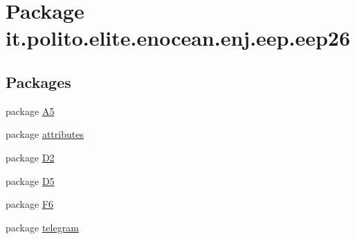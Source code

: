 \hypertarget{namespaceit_1_1polito_1_1elite_1_1enocean_1_1enj_1_1eep_1_1eep26}{}\section{Package it.\+polito.\+elite.\+enocean.\+enj.\+eep.\+eep26}
\label{namespaceit_1_1polito_1_1elite_1_1enocean_1_1enj_1_1eep_1_1eep26}
\subsection*{Packages}
\begin{DoxyCompactItemize}
\item 
package \hyperlink{namespaceit_1_1polito_1_1elite_1_1enocean_1_1enj_1_1eep_1_1eep26_1_1_a5}{A5}
\item 
package \hyperlink{namespaceit_1_1polito_1_1elite_1_1enocean_1_1enj_1_1eep_1_1eep26_1_1attributes}{attributes}
\item 
package \hyperlink{namespaceit_1_1polito_1_1elite_1_1enocean_1_1enj_1_1eep_1_1eep26_1_1_d2}{D2}
\item 
package \hyperlink{namespaceit_1_1polito_1_1elite_1_1enocean_1_1enj_1_1eep_1_1eep26_1_1_d5}{D5}
\item 
package \hyperlink{namespaceit_1_1polito_1_1elite_1_1enocean_1_1enj_1_1eep_1_1eep26_1_1_f6}{F6}
\item 
package \hyperlink{namespaceit_1_1polito_1_1elite_1_1enocean_1_1enj_1_1eep_1_1eep26_1_1telegram}{telegram}
\end{DoxyCompactItemize}
